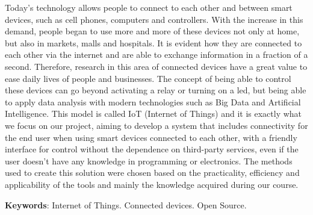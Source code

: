 \documentclass[../../layout.tex]{subfiles}
\begin{document}
\begin{resumo}[Abstract]
\hspace*{3em}
Today's technology allows people to connect to each other and between smart devices, such as cell phones, computers and controllers. With the increase in this demand, people began to use more and more of these devices not only at home, but also in markets, malls and hospitals. It is evident how they are connected to each other via the internet and are able to exchange information in a fraction of a second. Therefore, research in this area of connected devices have a great value to ease daily lives of people and businesses. The concept of being able to control these devices can go beyond activating a relay or turning on a led, but being able to apply data analysis with modern technologies such as Big Data and Artificial Intelligence. This model is called IoT (Internet of Things) and it is exactly what we focus on our project, aiming to develop a system that includes connectivity for the end user when using smart devices connected to each other, with a friendly interface for control without the dependence on third-party services, even if the user doesn't have any knowledge in programming or electronics. The methods used to create this solution were chosen based on the practicality, efficiency and applicability of the tools and mainly the knowledge acquired during our course.
\vspace{\onelineskip}

\noindent
\textbf{Keywords}: Internet of Things. Connected devices. Open Source.
\end{resumo}
\end{document}
